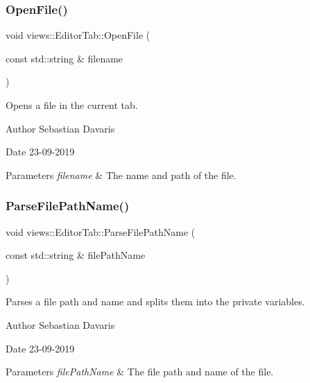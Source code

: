\subsubsection{\texorpdfstring{Open\+File()}{OpenFile()}}
{\footnotesize\ttfamily void views\+::\+Editor\+Tab\+::\+Open\+File (\begin{DoxyParamCaption}\item[{const std\+::string \&}]{filename }\end{DoxyParamCaption})}

Opens a file in the current tab. \begin{DoxyAuthor}{Author}
Sebastian Davaris 
\end{DoxyAuthor}
\begin{DoxyDate}{Date}
23-\/09-\/2019 
\end{DoxyDate}

\begin{DoxyParams}{Parameters}
{\em filename} & The name and path of the file. \\
\hline
\end{DoxyParams}
\mbox{\label{classviews_1_1_editor_tab_ab52b9be41dc185565539d2f9cf3ce515}} 
\subsubsection{\texorpdfstring{Parse\+File\+Path\+Name()}{ParseFilePathName()}}
{\footnotesize\ttfamily void views\+::\+Editor\+Tab\+::\+Parse\+File\+Path\+Name (\begin{DoxyParamCaption}\item[{const std\+::string \&}]{file\+Path\+Name }\end{DoxyParamCaption})\hspace{0.3cm}{\ttfamily [protected]}}

Parses a file path and name and splits them into the private variables. \begin{DoxyAuthor}{Author}
Sebastian Davaris 
\end{DoxyAuthor}
\begin{DoxyDate}{Date}
23-\/09-\/2019 
\end{DoxyDate}

\begin{DoxyParams}{Parameters}
{\em file\+Path\+Name} & The file path and name of the file. \\
\hline
\end{DoxyParams}
\mbox{\label{classviews_1_1_editor_tab_a39f3bd857e7553f8c0f36ebb99eebbfd}} 
